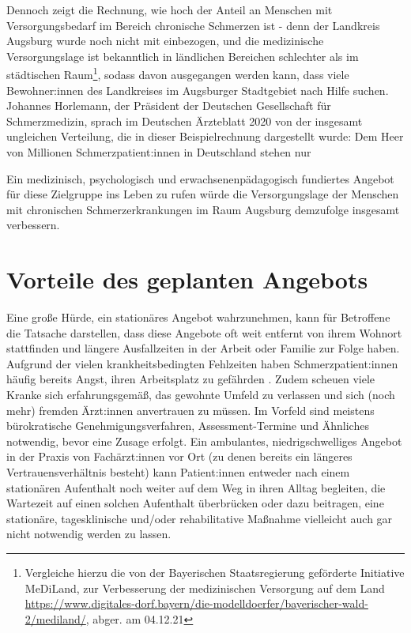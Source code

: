 \documentclass[
  twoside,
  parskip=half-,
]{scrreprt}
\begin{document}
Dennoch zeigt die Rechnung, wie hoch der Anteil an Menschen mit Versorgungsbedarf im Bereich chronische Schmerzen ist - denn der Landkreis Augsburg wurde noch nicht mit einbezogen, und die medizinische Versorgungslage ist bekanntlich in ländlichen Bereichen schlechter als im städtischen Raum\footnote{Vergleiche hierzu die von der Bayerischen Staatsregierung geförderte Initiative MeDiLand, zur Verbesserung der medizinischen Versorgung auf dem Land \url{https://www.digitales-dorf.bayern/die-modelldoerfer/bayerischer-wald-2/mediland/}, abger. am 04.12.21}, sodass davon ausgegangen werden kann, dass viele Bewohner:innen des Landkreises im Augsburger Stadtgebiet nach Hilfe suchen. Johannes Horlemann, der Präsident der Deutschen Gesellschaft für Schmerzmedizin, sprach im Deutschen Ärzteblatt 2020 von der insgesamt ungleichen Verteilung, die in dieser Beispielrechnung dargestellt wurde: Dem Heer von Millionen Schmerzpatient:innen in Deutschland stehen nur 

Ein medizinisch, psychologisch und erwachsenenpädagogisch fundiertes Angebot für diese Zielgruppe ins Leben zu rufen würde die Versorgungslage der Menschen mit chronischen Schmerzerkrankungen im Raum Augsburg demzufolge insgesamt verbessern.

\section{Vorteile des geplanten Angebots}

Eine große Hürde, ein stationäres Angebot wahrzunehmen, kann für Betroffene die Tatsache darstellen, dass diese Angebote oft weit entfernt von ihrem Wohnort stattfinden und längere Ausfallzeiten in der Arbeit oder Familie zur Folge haben. Aufgrund der vielen krankheitsbedingten Fehlzeiten haben Schmerzpatient:innen häufig bereits Angst, ihren Arbeitsplatz zu gefährden \autocite[vgl.][372]{fussnegger}. Zudem scheuen viele Kranke sich erfahrungsgemäß, das gewohnte Umfeld zu verlassen und sich (noch mehr) fremden Ärzt:innen anvertrauen zu müssen. Im Vorfeld sind meistens bürokratische Genehmigungsverfahren, Assessment-Termine und Ähnliches notwendig, bevor eine Zusage erfolgt. Ein ambulantes, niedrigschwelliges Angebot in der Praxis von Fachärzt:innen vor Ort (zu denen bereits ein längeres Vertrauensverhältnis besteht) kann Patient:innen entweder nach einem stationären Aufenthalt noch weiter auf dem Weg in ihren Alltag begleiten, die Wartezeit auf einen solchen Aufenthalt überbrücken oder dazu beitragen, eine stationäre, tagesklinische und/oder rehabilitative Maßnahme vielleicht auch gar nicht notwendig werden zu lassen.
\end{document}
